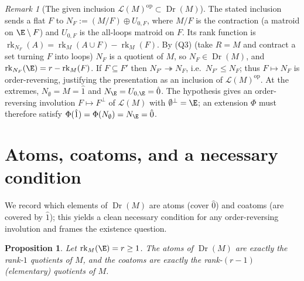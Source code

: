 \documentclass[11pt]{article}
\newcommand{\Dr}{\operatorname{Dr}}
\newcommand{\op}{\mathrm{op}}
\newcommand{\cL}{\mathcal{L}}
\newcommand{\rk}{\operatorname{rk}}
\newtheorem{proposition}{Proposition}
\theoremstyle{definition}
\theoremstyle{remark}
\newtheorem{remark}{Remark}
\begin{document}
\begin{remark}[The given inclusion $\cL(M)^{\op}\subset\Dr(M)$]\label{rem:incl}
The stated inclusion sends a flat $F$ to $N_F:=(M/F)\oplus U_{0,F}$, where $M/F$ is
the contraction (a matroid on $\E\setminus F$) and $U_{0,F}$ is the all-loops matroid
on $F$. Its rank function is $\rk_{N_F}(A)=\rk_M(A\cup F)-\rk_M(F)$. By (Q3) (take
$R=M$ and contract a set turning $F$ into loops) $N_F$ is a quotient of $M$, so
$N_F\in\Dr(M)$, and $\rk_{N_F}(\E)=r-\rk_M(F)$. If $F\subseteq F'$ then
$N_{F'}\twoheadrightarrow N_F$, i.e.\ $N_{F'}\le N_F$; thus $F\mapsto N_F$ is
order-reversing, justifying the presentation as an inclusion of $\cL(M)^{\op}$. At
the extremes, $N_{\emptyset}=M=\hat 1$ and $N_{\E}=U_{0,\E}=\hat 0$. The hypothesis
gives an order-reversing involution $F\mapsto F^{\perp}$ of $\cL(M)$ with
$\emptyset^{\perp}=\E$; an extension $\Phi$ must therefore satisfy
$\Phi(\hat 1)=\Phi(N_\emptyset)=N_{\E}=\hat 0$.
\end{remark}

\section{Atoms, coatoms, and a necessary condition}\label{sec:atoms}

We record which elements of $\Dr(M)$ are atoms (cover $\hat 0$) and coatoms (are
covered by $\hat 1$); this yields a clean necessary condition for any order-reversing
involution and frames the existence question.

\begin{proposition}\label{prop:atoms}
Let $\rk_M(\E)=r\ge 1$. The atoms of $\Dr(M)$ are exactly the rank-$1$ quotients of
$M$, and the coatoms are exactly the rank-$(r-1)$ (elementary) quotients of $M$.
\end{proposition}
\end{document}
